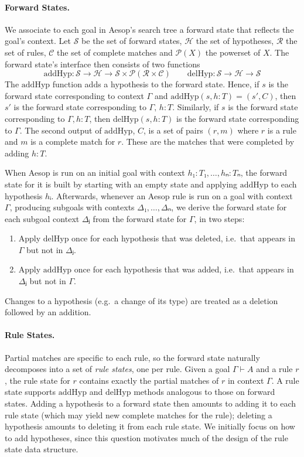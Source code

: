 \documentclass[runningheads,leqno]{llncs}
\newcommand{\para}[1]{\paragraph{\bfseries\upshape #1}}
\newcommand{\Rules}{\ensuremath{\mathcal{R}}}
\newcommand{\Hyps}{\ensuremath{\mathcal{H}}}
\newcommand{\States}{\ensuremath{\mathcal{S}}}
\newcommand{\CMatches}{\ensuremath{\mathcal{C}}}
\newcommand{\addHyp}{\ensuremath{\mathrm{addHyp}}}
\newcommand{\delHyp}{\ensuremath{\mathrm{delHyp}}}
\newcommand{\powerset}{\ensuremath{\mathcal{P}}}
\begin{document}
\para{Forward States.}
We associate to each goal in Aesop's search tree a forward state that reflects the goal's context.
Let $\States$ be the set of forward states, $\Hyps$ the set of hypotheses, $\Rules$ the set of rules, $\CMatches$ the set of complete matches and $\powerset(X)$ the powerset of $X$.
The forward state's interface then consists of two functions
\begin{equation*}
  \addHyp : \States → \Hyps → \States × \powerset(\Rules × \CMatches) \qquad \delHyp : \States → \Hyps → \States
\end{equation*}
The $\addHyp$ function adds a hypothesis to the forward state.
Hence, if $s$ is the forward state corresponding to context $Γ$ and $\addHyp(s, h : T) = (s', C)$, then $s'$ is the forward state corresponding to $Γ,\, h : T$.
Similarly, if $s$ is the forward state corresponding to $Γ, h : T$, then $\delHyp(s, h : T)$ is the forward state corresponding to $Γ$.
The second output of $\addHyp$, $C$, is a set of pairs $(r, m)$ where $r$ is a rule and $m$ is a complete match for $r$.
These are the matches that were completed by adding $h : T$.

When Aesop is run on an initial goal with context $h₁ : T₁, \dots, hₙ : Tₙ$, the forward state for it is built by starting with an empty state and applying $\addHyp$ to each hypothesis $hᵢ$.
Afterwards, whenever an Aesop rule is run on a goal with context $Γ$, producing subgoals with contexts $Δ₁, \dots, Δₙ$, we derive the forward state for each subgoal context $Δⱼ$ from the forward state for $Γ$, in two steps:
\begin{enumerate}
  \item Apply $\delHyp$ once for each hypothesis that was deleted, i.e.\ that appears in $Γ$ but not in $Δⱼ$.
  \item Apply $\addHyp$ once for each hypothesis that was added, i.e.\ that appears in $Δⱼ$ but not in $Γ$.
\end{enumerate}
Changes to a hypothesis (e.g.\ a change of its type) are treated as a deletion followed by an addition.

\para{Rule States.}
Partial matches are specific to each rule, so the forward state naturally decomposes into a set of \emph{rule states}, one per rule.
Given a goal $Γ ⊢ A$ and a rule $r$, the rule state for $r$ contains exactly the partial matches of $r$ in context $Γ$.
A rule state supports $\addHyp$ and $\delHyp$ methods analogous to those on forward states.
Adding a hypothesis to a forward state then amounts to adding it to each rule state (which may yield new complete matches for the rule); deleting a hypothesis amounts to deleting it from each rule state.
We initially focus on how to add hypotheses, since this question motivates much of the design of the rule state data structure.
\end{document}
